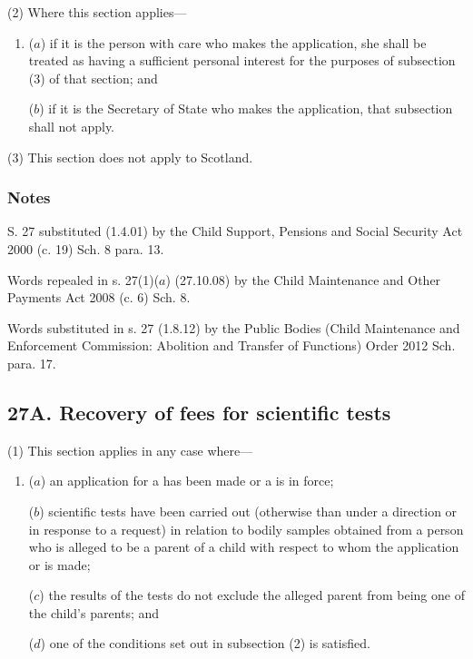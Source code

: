 \documentclass[a4paper]{article}
\newcommand\amendment[1]{\subsubsection*{Notes}{\itshape\frenchspacing\footnotesize #1 \par}}
\begin{document}
(2) Where this section applies---
\begin{enumerate}\item[]
($a$) if it is the person with care who makes the application, she shall be treated as having a sufficient personal interest for the purposes of subsection (3) of that section; and

($b$) if it is the Secretary of State who makes the application, that subsection shall not apply.
\end{enumerate}

(3) This section does not apply to Scotland.

\amendment{

S. 27 substituted (1.4.01) by the Child Support, Pensions and Social Security Act 2000 (c. 19) Sch. 8 para. 13.

Words repealed in s. 27(1)($a$) (27.10.08) by the Child Maintenance and Other Payments Act 2008 (c. 6) Sch. 8.

Words substituted in s. 27 (1.8.12) by the Public Bodies (Child Maintenance and Enforcement Commission: Abolition and Transfer of Functions) Order 2012 Sch. para. 17.
}

\subsection{27A. Recovery of fees for scientific tests}

(1) This section applies in any case where---
\begin{enumerate}\item[]
($a$) an application for a  has been made or a  is in force;

($b$)
scientific tests have been carried out (otherwise than under a direction or in response to a request) in relation to bodily samples obtained from a person who is alleged to be a parent of a child with respect to whom the application or  is made;

($c$)
the results of the tests do not exclude the alleged parent from being one of the child’s parents; and

($d$)
one of the conditions set out in subsection (2) is satisfied.
\end{enumerate}
\end{document}
